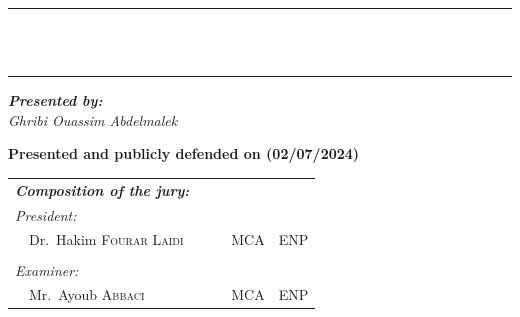 {\begin{titlepage}
    \vspace{3mm}

    \center


    \vspace{2mm}


    \vspace{3mm}

    \begin{bfseries}
        \rule{\linewidth}{1pt} \\
        \vspace{3mm}
         \\
        \vspace{3mm}
        \rule{\linewidth}{1pt}
    \end{bfseries}

    \begin{flushleft}
        \textit{\textbf{Presented by:}}      \\
        \textit{Ghribi Ouassim Abdelmalek} \\

    \end{flushleft}

    \begin{flushleft}
        \textbf{Presented and publicly defended on (02/07/2024)}
    \end{flushleft}

    \begin{flushleft}
        \noindent \large
        \begin{tabular}{llcll}
            \textit{\textbf{Composition of the jury:}}             &  &             &                    \\
            \textit{President:}                                    &  &             &                    \\
            \multicolumn{2}{l}{~~Dr.\ Hakim \textsc{Fourar Laidi}} &  & MCA         & ENP                \\

            \\
            \textit{Examiner:}                                     &  &             &                    \\
            \multicolumn{2}{l}{~~Mr.\ Ayoub \textsc{Abbaci}}       &  & MCA         & ENP                \\


\end{tabular}
\end{flushleft}
\end{titlepage}}
